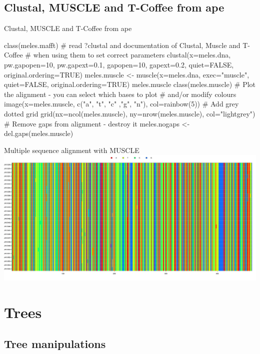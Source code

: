 \documentclass[compress, ucs, xelatex, 11pt, xcolor=svgnames,
  hyperref={
    bookmarks=true,
    unicode=true,
    colorlinks=true,
    pdftitle={Molecular data in R},
    plainpages=false,
    pdfauthor={Vojtech Zeisek},
    pdfsubject={Course about phylogeny and evolution in R},
    pdfcreator={XeLaTeX},
    pdfkeywords={R, evolution, phylogeny, molecular data},
    linkcolor=Tomato,
    anchorcolor=SaddleBrown,
    citecolor=Goldenrod,
    filecolor=DarkMagenta,
    menucolor=Sienna,
    urlcolor=DarkTurquoise,
    pdftex},
  url={hyphens, lowtilde} %
  ]{beamer}
\begin{document}
\subsection{Clustal, MUSCLE and T-Coffee from ape}

\begin{frame}[fragile]{Clustal, MUSCLE and T-Coffee from ape}
  \begin{spluscode}
    class(meles.mafft)
    # read ?clustal and documentation of Clustal, Muscle and T-Coffee
    # when using them to set correct parameters
    clustal(x=meles.dna, pw.gapopen=10, pw.gapext=0.1, gapopen=10,
      gapext=0.2, quiet=FALSE, original.ordering=TRUE)
    meles.muscle <- muscle(x=meles.dna, exec="muscle",
      quiet=FALSE, original.ordering=TRUE)
    meles.muscle
    class(meles.muscle)
    # Plot the alignment - you can select which bases to plot
    # and/or modify colours
    image(x=meles.muscle, c("a", "t", "c" ,"g", "n"), col=rainbow(5))
    # Add grey dotted grid
    grid(nx=ncol(meles.muscle), ny=nrow(meles.muscle), col="lightgrey")
    # Remove gaps from alignment - destroy it
    meles.nogaps <- del.gaps(meles.muscle)
  \end{spluscode}
\end{frame}

\begin{frame}{Multiple sequence alignment with MUSCLE}
\includegraphics[width=\textwidth]{muscle.png}
\end{frame}

\section{Trees}

\subsection{Tree manipulations}
\end{document}
